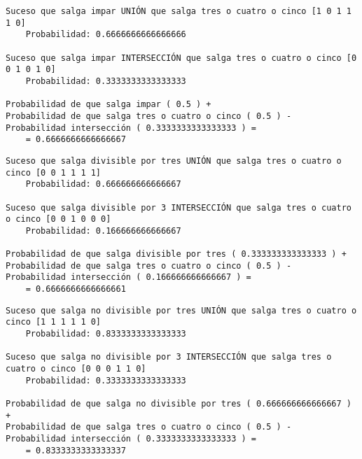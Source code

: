 \documentclass[11pt]{article}
\begin{document}
    \begin{Verbatim}[commandchars=\\\{\}]
Suceso que salga impar UNIÓN que salga tres o cuatro o cinco [1 0 1 1 1 0] 
	Probabilidad: 0.6666666666666666

Suceso que salga impar INTERSECCIÓN que salga tres o cuatro o cinco [0 0 1 0 1 0] 
	Probabilidad: 0.3333333333333333

Probabilidad de que salga impar ( 0.5 ) + 
Probabilidad de que salga tres o cuatro o cinco ( 0.5 ) - 
Probabilidad intersección ( 0.3333333333333333 ) = 
	= 0.6666666666666667

    \end{Verbatim}

    \begin{Verbatim}[commandchars=\\\{\}]
Suceso que salga divisible por tres UNIÓN que salga tres o cuatro o cinco [0 0 1 1 1 1] 
	Probabilidad: 0.666666666666667

Suceso que salga divisible por 3 INTERSECCIÓN que salga tres o cuatro o cinco [0 0 1 0 0 0] 
	Probabilidad: 0.166666666666667

Probabilidad de que salga divisible por tres ( 0.333333333333333 ) + 
Probabilidad de que salga tres o cuatro o cinco ( 0.5 ) - 
Probabilidad intersección ( 0.166666666666667 ) = 
	= 0.6666666666666661

    \end{Verbatim}

    \begin{Verbatim}[commandchars=\\\{\}]
Suceso que salga no divisible por tres UNIÓN que salga tres o cuatro o cinco [1 1 1 1 1 0] 
	Probabilidad: 0.8333333333333333

Suceso que salga no divisible por 3 INTERSECCIÓN que salga tres o cuatro o cinco [0 0 0 1 1 0] 
	Probabilidad: 0.3333333333333333

Probabilidad de que salga no divisible por tres ( 0.666666666666667 ) + 
Probabilidad de que salga tres o cuatro o cinco ( 0.5 ) - 
Probabilidad intersección ( 0.3333333333333333 ) = 
	= 0.8333333333333337

    \end{Verbatim}


    
    
    
    
\end{document}
